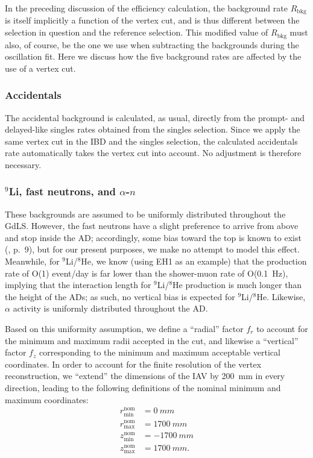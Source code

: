 \documentclass[../thesis.tex]{subfiles}
\begin{document}
In the preceding discussion of the efficiency calculation, the background rate $R_{\mathrm{bkg}}$ is itself implicitly a function of the vertex cut, and is thus different between the selection in question and the reference selection. This modified value of $R_{\mathrm{bkg}}$ must also, of course, be the one we use when subtracting the backgrounds during the oscillation fit. Here we discuss how the five background rates are affected by the use of a vertex cut.

\subsubsection{Accidentals}

The accidental background is calculated, as usual, directly from the prompt- and delayed-like singles rates obtained from the singles selection. Since we apply the same vertex cut in the IBD and the singles selection, the calculated accidentals rate automatically takes the vertex cut into account. No adjustment is therefore necessary.

\subsubsection{$^9$Li, fast neutrons, and $\alpha$-$n$}

These backgrounds are assumed to be uniformly distributed throughout the GdLS. However, the fast neutrons have a slight preference to arrive from above and stop inside the AD; accordingly, some bias toward the top is known to exist (\cite{jianrunHERA}, p.\ 9), but for our present purposes, we make no attempt to model this effect.
%
Meanwhile, for $^9$Li/$^8$He, we know (using EH1 as an example) that the production rate of O(1) event/day is far lower than the shower-muon rate of O(0.1~Hz), implying that the interaction length for $^9$Li/$^8$He production is much longer than the height of the ADs; as such, no vertical bias is expected for $^9$Li/$^8$He.
%
Likewise, $\alpha$ activity is uniformly distributed throughout the AD.

Based on this uniformity assumption, we define a ``radial'' factor $f_r$ to account for the minimum and maximum radii accepted in the cut, and likewise a ``vertical'' factor $f_z$ corresponding to the minimum and maximum acceptable vertical coordinates. In order to account for the finite resolution of the vertex reconstruction, we ``extend'' the dimensions of the IAV by 200~mm in every direction, leading to the following definitions of the nominal minimum and maximum coordinates:
\begin{equation}
  \begin{aligned}
  r_{\mathrm{min}}^{\mathrm{nom}} &= \SI{0}{mm}\\
  r_{\mathrm{max}}^{\mathrm{nom}} &= \SI{1700}{mm}\\
  z_{\mathrm{min}}^{\mathrm{nom}} &= \SI{-1700}{mm}\\
  z_{\mathrm{max}}^{\mathrm{nom}} &= \SI{1700}{mm}.
\end{aligned}
\end{equation}
\end{document}
